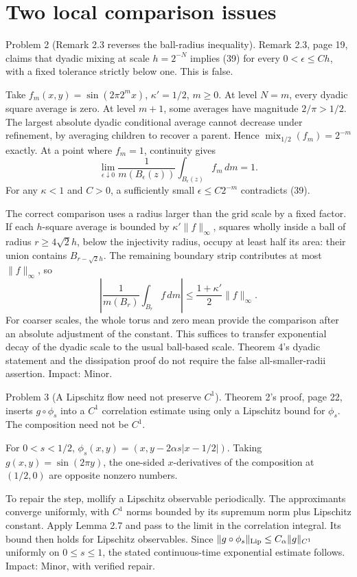 \documentclass[10pt]{article}
\begin{document}
\section*{Two local comparison issues}
Problem 2 (Remark 2.3 reverses the ball-radius inequality).  Remark 2.3, page 19, claims that dyadic mixing at scale \(h=2^{-N}\) implies (39) for every \(0<\epsilon\le Ch\), with a fixed tolerance strictly below one. This is false.\par
Take \(f_m(x,y)=\sin(2\pi2^m x)\), \(\kappa'=1/2\), \(m\ge0\). At level \(N=m\), every dyadic square average is zero. At level \(m+1\), some averages have magnitude \(2/\pi>1/2\). The largest absolute dyadic conditional average cannot decrease under refinement, by averaging children to recover a parent. Hence \(\operatorname{mix}_{1/2}(f_m)=2^{-m}\) exactly. At a point where \(f_m=1\), continuity gives \[\lim_{\epsilon\downarrow0}\frac1{m(B_\epsilon(z))}\int_{B_\epsilon(z)}f_m\,dm=1.\] For any \(\kappa<1\) and \(C>0\), a sufficiently small \(\epsilon\le C2^{-m}\) contradicts (39).\par
The correct comparison uses a radius larger than the grid scale by a fixed factor. If each \(h\)-square average is bounded by \(\kappa'\|f\|_\infty\), squares wholly inside a ball of radius \(r\ge4\sqrt2h\), below the injectivity radius, occupy at least half its area: their union contains \(B_{r-\sqrt2h}\). The remaining boundary strip contributes at most \(\|f\|_\infty\), so \[\left|\frac1{m(B_r)}\int_{B_r}f\,dm\right|\le\frac{1+\kappa'}2\|f\|_\infty.\] For coarser scales, the whole torus and zero mean provide the comparison after an absolute adjustment of the constant. This suffices to transfer exponential decay of the dyadic scale to the usual ball-based scale. Theorem 4’s dyadic statement and the dissipation proof do not require the false all-smaller-radii assertion. Impact: Minor.\par
Problem 3 (A Lipschitz flow need not preserve \(C^1\)).  Theorem 2’s proof, page 22, inserts \(g\circ\phi_s\) into a \(C^1\) correlation estimate using only a Lipschitz bound for \(\phi_s\). The composition need not be \(C^1\).\par
For \(0<s<1/2\), \(\phi_s(x,y)=(x,y-2\alpha s|x-1/2|)\). Taking \(g(x,y)=\sin(2\pi y)\), the one-sided \(x\)-derivatives of the composition at \((1/2,0)\) are opposite nonzero numbers.\par
To repair the step, mollify a Lipschitz observable periodically. The approximants converge uniformly, with \(C^1\) norms bounded by its supremum norm plus Lipschitz constant. Apply Lemma 2.7 and pass to the limit in the correlation integral. Its bound then holds for Lipschitz observables. Since \(\|g\circ\phi_s\|_{\rm Lip}\le C_\alpha\|g\|_{C^1}\) uniformly on \(0\le s\le1\), the stated continuous-time exponential estimate follows. Impact: Minor, with verified repair.\par
\end{document}
